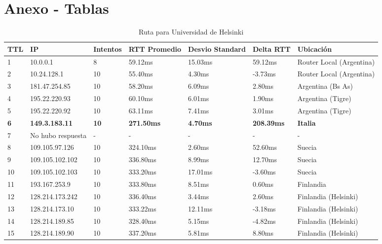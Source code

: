 \section{Anexo - Tablas}

\begin{table}[H]
	\centering
	\caption{Ruta para Universidad de Helsinki}
	\label{table:ruta-finlandia}
	\begin{tabular}{|l|l|l|l|l|l|l|}
		\hline
		TTL & IP & Intentos & RTT Promedio & Desvio Standard & Delta RTT & Ubicación \\ \hline 
		1 & 10.0.0.1 & 8 & 59.12ms & 15.03ms & 59.12ms & Router Local (Argentina) \\ \hline 
		2 & 10.24.128.1 & 10 & 55.40ms & 4.30ms & -3.73ms & Router Local (Argentina) \\ \hline 
		3 & 181.47.254.85 & 10 & 58.20ms & 6.09ms & 2.80ms & Argentina (Bs As) \\ \hline 
		4 & 195.22.220.93 & 10 & 60.10ms & 6.01ms & 1.90ms & Argentina (Tigre) \\ \hline 
		5 & 195.22.220.92 & 10 & 63.11ms & 7.41ms & 3.01ms & Argentina (Tigre) \\ \hline 
		\textbf{6} & \textbf{149.3.183.11} & \textbf{10} & \textbf{271.50ms} & \textbf{4.70ms} & \textbf{208.39ms} & \textbf{Italia} \\ \hline 
		7 & No hubo respuesta & - & - & - & - & - \\ \hline 
		8 & 109.105.97.126 & 10 & 324.10ms & 2.60ms & 52.60ms & Suecia \\ \hline 
		9 & 109.105.102.102 & 10 & 336.80ms & 8.99ms & 12.70ms & Suecia \\ \hline 
		10 & 109.105.102.103 & 10 & 333.20ms & 17.01ms & -3.60ms& Suecia \\ \hline 
		11 & 193.167.253.9 & 10 & 333.80ms & 8.51ms & 0.60ms & Finlandia \\ \hline 
		12 & 128.214.173.242 & 10 & 336.40ms & 3.44ms & 2.60ms & Finlandia (Helsinki) \\ \hline 
		13 & 128.214.173.10 & 10 & 333.22ms & 12.11ms & -3.18ms & Finlandia (Helsinki) \\ \hline 
		14 & 128.214.189.85 & 10 & 328.40ms & 5.15ms & -4.82ms & Finlandia (Helsinki) \\ \hline 
		15 & 128.214.189.90 & 10 & 337.20ms & 5.81ms & 8.80ms & Finlandia (Helsinki) \\ \hline
	\end{tabular}
\end{table}

